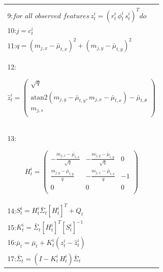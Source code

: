 \documentclass[10pt,a4paper]{article}
\begin{document}
\begin{table}[H]
\begin{center}
\begin{tabular}{|l|}
\begin{minipage}{0.2\textwidth}
\begin{equation*}
\end{equation*}
\end{minipage}\\
9:\hspace{6mm}$\textit{for all observed features}\,z_t^i=(r_t^i\,\phi_t^i\,s_t^i)^T\textit{do}$\\
10:\hspace{12mm}$j=c_t^i$\\
11:\hspace{12mm}$q=(m_{j,x}-\bar{\mu}_{t,x})^2+(m_{j,y}-\bar{\mu}_{t,y})^2$\\
12:\hspace{12mm}
\begin{minipage}{0.2\textwidth}
\begin{equation*}
\hat{z}_t^i=
\left(\begin{array}{c}
\sqrt{q}\\
\text{atan}2(m_{j,y}-\bar{\mu}_{t,y},m_{j,x}-\bar{\mu}_{t,x})-\bar{\mu}_{t,\theta}\\
m_{j,s}\\
\end{array}\right)
\end{equation*}
\end{minipage}\\
13:\hspace{12mm}
\begin{minipage}{0.2\textwidth}
\begin{equation*}
H_t^i=
\left(\begin{array}{ccc}
-\frac{m_{j,x}-\bar{\mu}_{t,x}}{\sqrt{q}}&-\frac{m_{j,y}-\bar{\mu}_{t,y}}{\sqrt{q}}&0\\
\frac{m_{j,y}-\bar{\mu}_{t,y}}{q}&-\frac{m_{j,x}-\bar{\mu}_{t,x}}{q}&-1\\
0&0&0\\
\end{array}\right)
\end{equation*}
\end{minipage}\\
14:\hspace{12mm}$S_t^i=H_t^i\bar{\varSigma}_t[H_t^i]^T+Q_t$\\
15:\hspace{12mm}$K_t^i=\bar{\varSigma}_t[H_t^i]^T[S_t^i]^{-1}$\\
16:\hspace{12mm}$\bar{\mu}_t=\bar{\mu}_t+K_t^i(z_t^i-\hat{z}_t^i)$\\
17:\hspace{12mm}$\bar{\varSigma}_t=(I-K_t^i\,H_t^i)\bar{\varSigma}_t$\\

\end{tabular}
\end{center}
\end{table}
\end{document}
